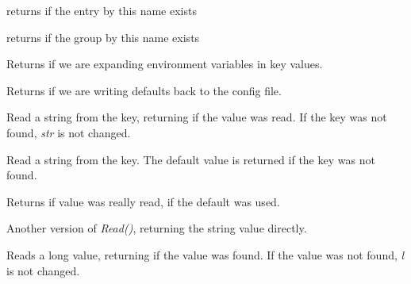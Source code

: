 \label{wxconfigbasehasentry}


returns \true if the entry by this name exists


\label{wxconfigbasehasgroup}


returns \true if the group by this name exists


\label{wxconfigbaseisexpandingenvvars}


Returns \true if we are expanding environment variables in key values.


\label{wxconfigbaseisrecordingdefaults}


Returns \true if we are writing defaults back to the config file.


\label{wxconfigbaseread}


Read a string from the key, returning \true if the value was read. If the key
was not found, {\it str} is not changed.


Read a string from the key. The default value is returned if the key was not
found.

Returns \true if value was really read, \false if the default was used.


Another version of {\it Read()}, returning the string value directly.


Reads a long value, returning \true if the value was found. If the value was
not found, {\it l} is not changed.


